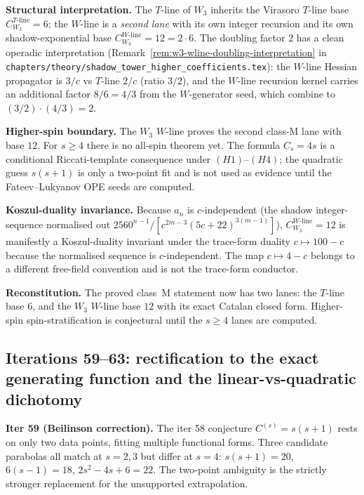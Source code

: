\documentclass[11pt]{article}
\begin{document}
\textbf{Structural interpretation.} The $T$-line of $W_3$ inherits
the Virasoro $T$-line base $C_{W_3}^{T\text{-line}} = 6$; the
$W$-line is a \emph{second lane} with its own integer recursion
and its own shadow-exponential base $C_{W_3}^{W\text{-line}} = 12
= 2 \cdot 6$. The doubling factor $2$ has a clean operadic
interpretation (Remark~\ref{rem:w3-wline-doubling-interpretation}
in \texttt{chapters/theory/shadow\_tower\_higher\_coefficients.tex}):
the $W$-line Hessian propagator is $3/c$ vs $T$-line $2/c$ (ratio
$3/2$), and the $W$-line recursion kernel carries an
additional factor $8/6 = 4/3$ from the $W$-generator seed, which
combine to
$(3/2) \cdot (4/3) = 2$.

\textbf{Higher-spin boundary.} The $W_3$ $W$-line proves the
second class-M lane with base $12$.  For $s\ge4$ there is no
all-spin theorem yet.  The formula $C_s=4s$ is a conditional
Riccati-template consequence under $(H1)$--$(H4)$; the quadratic
guess $s(s+1)$ is only a two-point fit and is not used as
evidence until the Fateev--Lukyanov OPE seeds are computed.

\textbf{Koszul-duality invariance.} Because $a_n$ is $c$-independent
(the shadow integer-sequence normalised out $2560^{n-1} / [c^{2m-3}
(5c+22)^{3(m-1)}]$), $C_{W_3}^{W\text{-line}} = 12$ is manifestly
a Koszul-duality invariant under the trace-form duality
$c\mapsto100-c$ because the normalised sequence is
$c$-independent.  The map $c\mapsto4-c$ belongs to a different
free-field convention and is not the trace-form conductor.

\textbf{Reconstitution.} The proved class~M statement now has
two lanes: the $T$-line base $6$, and the $W_3$ $W$-line base
$12$ with its exact Catalan closed form.  Higher-spin
spin-stratification is conjectural until the $s\ge4$ lanes are
computed.

\subsection{Iterations 59--63: rectification to the exact
generating function and the linear-vs-quadratic dichotomy}
\label{subsec:loop-iter-59-63-gf-dichotomy}

\textbf{Iter 59 (Beilinson correction).} The iter 58 conjecture
$C^{(s)} = s(s+1)$ rests on only two data points, fitting
multiple functional forms. Three candidate parabolas all match
at $s = 2, 3$ but differ at $s = 4$: $s(s+1) = 20$,
$6(s-1) = 18$, $2s^2 - 4s + 6 = 22$. The two-point ambiguity is the
strictly stronger replacement for the unsupported extrapolation.
\end{document}
